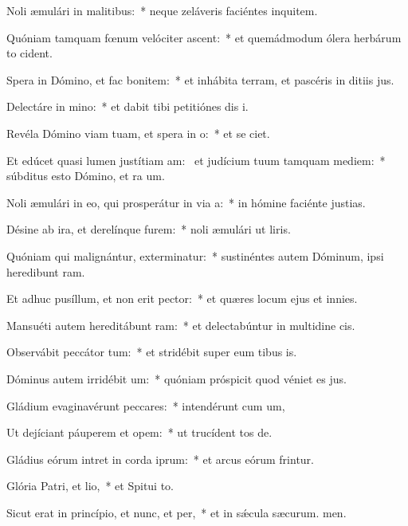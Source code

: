 \item Noli æmulári in malitibus:~* neque zeláveris faciéntes inquitem.
\item Quóniam tamquam fœnum velóciter ascent:~* et quemádmodum ólera herbárum to cident.
\item Spera in Dómino, et fac bonitem:~* et inhábita terram, et pascéris in ditiis jus.
\item Delectáre in mino:~* et dabit tibi petitiónes dis i.
\item Revéla Dómino viam tuam, et spera in o:~* et se ciet.
\item Et edúcet quasi lumen justítiam am:~\pscross{} et judícium tuum tamquam mediem:~* súbditus esto Dómino, et ra um.
\item Noli æmulári in eo, qui prosperátur in via a:~* in hómine faciénte justias.
\item Désine ab ira, et derelínque furem:~* noli æmulári ut liris.
\item Quóniam qui malignántur, exterminatur:~* sustinéntes autem Dóminum, ipsi heredibunt ram.
\item Et adhuc pusíllum, et non erit pector:~* et quæres locum ejus et  innies.
\item Mansuéti autem hereditábunt ram:~* et delectabúntur in multidine cis.
\item Observábit peccátor tum:~* et stridébit super eum tibus is.
\item Dóminus autem irridébit um:~* quóniam próspicit quod véniet es jus.
\item Gládium evaginavérunt peccares:~* intendérunt cum um,
\item Ut dejíciant páuperem et opem:~* ut trucídent tos de.
\item Gládius eórum intret in corda iprum:~* et arcus eórum frintur.
\item Glória Patri, et lio,~* et Spitui to.
\item Sicut erat in princípio, et nunc, et per,~* et in sǽcula sæcurum. men.
